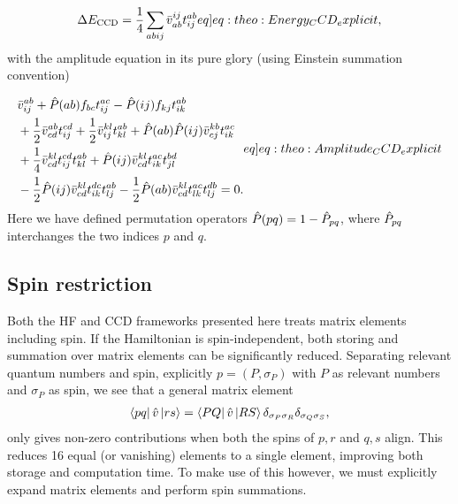 \begin{align}
    \DECCD = \frac{1}{4} \sum_{abij} \elmASshort{ij}{ab} \amplitude{ab}{ij} \label[eq]{eq:theo:Energy_CCD_explicit},
\end{align}
with the amplitude equation in its pure glory (using Einstein summation convention)

\begin{align}
    \begin{split}
        &\elmASshort{ab}{ij} + \permoperator{ab} \fshort{b}{c} \amplitude{ac}{ij} - \permoperator{ij} \fshort{k}{j} \amplitude{ab}{ik} \\
        &+ \frac{1}{2} \elmASshort{ab}{cd} \amplitude{cd}{ij} + \frac{1}{2} \elmASshort{kl}{ij} \amplitude{ab}{kl} + \permoperator{ab} \permoperator{ij}\elmASshort{kb}{cj} \amplitude{ac}{ik} \\
        &+ \frac{1}{4}\elmASshort{kl}{cd} \amplitude{cd}{ij} \amplitude{ab}{kl} + \permoperator{ij} \elmASshort{kl}{cd} \amplitude{ac}{ik} \amplitude{bd}{jl} \\
        &- \frac{1}{2} \permoperator{ij} \elmASshort{kl}{cd} \amplitude{dc}{ik} \amplitude{ab}{lj} - \frac{1}{2} \permoperator{ab} \elmASshort{kl}{cd} \amplitude{ac}{lk} \amplitude{db}{lj} = 0.
    \end{split}\label[eq]{eq:theo:Amplitude_CCD_explicit}
\end{align}
Here we have defined permutation operators $\hat{P}(pq) = 1 - \hat{P}_{pq}$, where $\hat{P}_{pq}$ interchanges the two indices $p$ and $q$.

\subsection{Spin restriction}
Both the HF and CCD frameworks presented here treats matrix elements including spin. If the Hamiltonian is spin-independent, both storing and summation over matrix elements can be significantly reduced. Separating relevant quantum numbers and spin, explicitly $p = (P,\sigma_P)$ with $P$ as relevant numbers and $\sigma_P$ as spin, we see that a general matrix element
\begin{align*}
    \bra{pq}\hat{v}\ket{rs} = \bra{PQ}\hat{v}\ket{RS} \delta_{\sigma_P \sigma_R} \delta_{\sigma_Q \sigma_S},
\end{align*}
only gives non-zero contributions when both the spins of $p,r$ and $q,s$ align. This reduces 16 equal (or vanishing) elements to a single element, improving both storage and computation time. To make use of this however, we must explicitly expand matrix elements and perform spin summations.